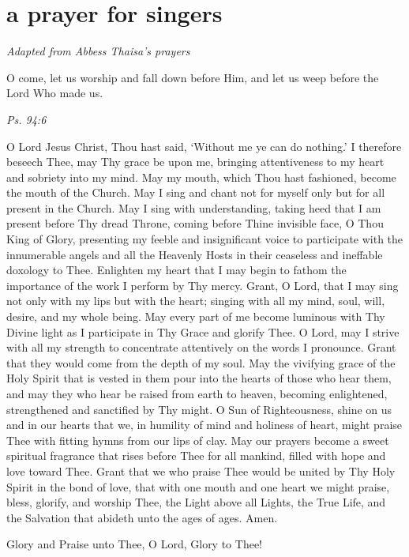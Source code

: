 \section{a prayer for singers}

\begin{center}
   {\textit{\small Adapted from Abbess Thaisa's prayers}}
\end{center}


\epigraph{O come, let us worship and fall down before Him, and let us weep before the Lord Who made us.}{\textit{Ps. 94:6}}

O Lord Jesus Christ, Thou hast said, `Without me ye can do nothing.' I therefore beseech Thee, may Thy grace be upon me, bringing attentiveness to my heart and sobriety into my mind. May my mouth, which Thou hast fashioned, become the mouth of the Church. May I sing and chant not for myself only but for all present in the Church. May I sing with understanding, taking heed that I am present before Thy dread Throne, coming before Thine invisible face, O Thou King of Glory, presenting my feeble and insignificant voice to participate with the innumerable angels and all the Heavenly Hosts in their ceaseless and ineffable doxology to Thee. Enlighten my heart that I may begin to fathom the importance of the work I perform by Thy mercy. Grant, O Lord, that I may sing not only with my lips but with the heart; singing with all my mind, soul, will, desire, and my whole being. May every part of me become luminous with Thy Divine light as I participate in Thy Grace and glorify Thee. O Lord, may I strive with all my strength to concentrate attentively on the words I pronounce. Grant that they would come from the depth of my soul. May the vivifying grace of the Holy Spirit that is vested in them pour into the hearts of those who hear them, and may they who hear be raised from earth to heaven, becoming enlightened, strengthened and sanctified by Thy might. O Sun of Righteousness, shine on us and in our hearts that we, in humility of mind and holiness of heart, might praise Thee with fitting hymns from our lips of clay. May our prayers become a sweet spiritual fragrance that rises before Thee for all mankind, filled with hope and love toward Thee. Grant that we who praise Thee would be united by Thy Holy Spirit in the bond of love, that with one mouth and one heart we might praise, bless, glorify, and worship Thee, the Light above all Lights, the True Life, and the Salvation that abideth unto the ages of ages. Amen.


Glory and Praise unto Thee, O Lord, Glory to Thee!

